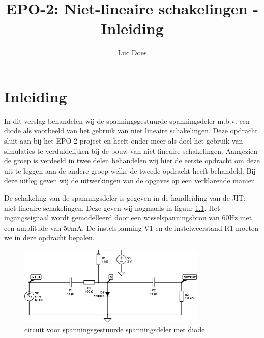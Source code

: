 \documentclass{report}
\title{EPO-2: Niet-lineaire schakelingen - Inleiding}
\author{Luc Does}
\begin{document}
\chapter{Inleiding}
\label{ch:inleiding}

In dit verslag behandelen wij de spanningsgestuurde spanningsdeler m.b.v. een diode als voorbeeld van het gebruik van niet lineaire schakelingen. Deze opdracht sluit aan bij het EPO-2 project en heeft onder meer als doel het gebruik van simulaties te verduidelijken bij de bouw van niet-lineaire schakelingen. \newline
Aangezien de groep is verdeeld in twee delen behandelen wij hier de eerste opdracht om deze uit te leggen aan de andere groep welke de tweede opdracht heeft behandeld. Bij deze uitleg geven wij de uitwerkingen van de opgaves op een verklarende manier.
\newline

\noindent De schakeling van de spanningsdeler is gegeven in de handleiding van de JIT: niet-lineaire schakelingen. Deze geven wij nogmaals in figuur \ref{fig:totaalschema}. Het ingangssignaal wordt gemodelleerd door een wisselspanningsbron van 60Hz met een amplitude van 50mA. De instelspanning V1 en de instelweerstand R1 moeten we in deze opdracht bepalen.

\begin{figure}[H]
	\centering
	\includegraphics[width=0.8\textwidth]{totaal-circuit-spanningsgestuurde-spanningsdeler.png}
	\caption{circuit voor spanningsgestuurde spanningsdeler met diode}
	\label{fig:totaalschema}
\end{figure}
\end{document}
